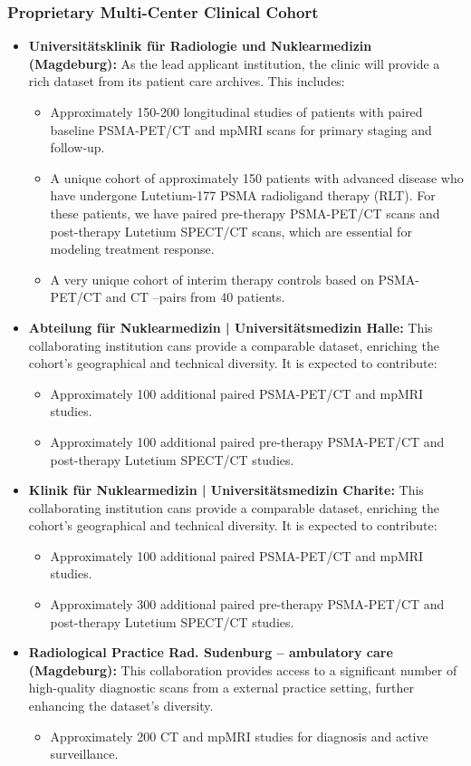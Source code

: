\documentclass[11pt, a4paper]{article}
\begin{document}
\subsubsection{Proprietary Multi-Center Clinical Cohort}
\begin{itemize}
    \item \textbf{Universitätsklinik für Radiologie und Nuklearmedizin (Magdeburg):} As the lead applicant institution, the clinic will provide a rich dataset from its patient care archives. This includes:
    \begin{itemize}
        \item Approximately 150-200 longitudinal studies of patients with paired baseline PSMA-PET/CT and mpMRI scans for primary staging and follow-up.
        \item A unique cohort of approximately 150 patients with advanced disease who have undergone Lutetium-177 PSMA radioligand therapy (RLT). For these patients, we have paired pre-therapy PSMA-PET/CT scans and post-therapy Lutetium SPECT/CT scans, which are essential for modeling treatment response.
        \item A very unique cohort of interim therapy controls based on PSMA-PET/CT and CT –pairs from 40 patients.
    \end{itemize}
    \item \textbf{Abteilung für Nuklearmedizin | Universitätsmedizin Halle:} This collaborating institution cans provide a comparable dataset, enriching the cohort’s geographical and technical diversity. It is expected to contribute:
    \begin{itemize}
        \item Approximately 100 additional paired PSMA-PET/CT and mpMRI studies.
        \item Approximately 100 additional paired pre-therapy PSMA-PET/CT and post-therapy Lutetium SPECT/CT studies.
    \end{itemize}
    \item \textbf{Klinik für Nuklearmedizin | Universitätsmedizin Charite:} This collaborating institution cans provide a comparable dataset, enriching the cohort’s geographical and technical diversity. It is expected to contribute:
    \begin{itemize}
        \item Approximately 100 additional paired PSMA-PET/CT and mpMRI studies.
        \item Approximately 300 additional paired pre-therapy PSMA-PET/CT and post-therapy Lutetium SPECT/CT studies.
    \end{itemize}
    \item \textbf{Radiological Practice Rad. Sudenburg – ambulatory care (Magdeburg):} This collaboration provides access to a significant number of high-quality diagnostic scans from a external practice setting, further enhancing the dataset’s diversity.
    \begin{itemize}
        \item Approximately 200 CT and mpMRI studies for diagnosis and active surveillance.
    \end{itemize}
\end{itemize}
\end{document}
